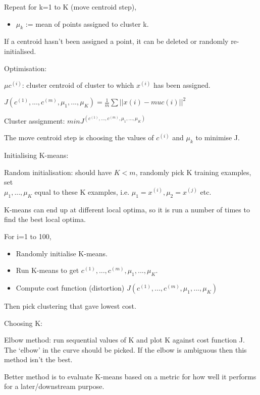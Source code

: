 \documentclass[12pt] {article}
\begin{document}
{    Repeat for k=1 to K (move centroid step),
    \begin{itemize}
    \vspace{-1em}
      \item $\mu_k$ := mean of points assigned to cluster k.
    \end{itemize}

    If a centroid hasn't been assigned a point, it can be deleted
    or randomly re-initialised. 

    Optimisation:

    $\mu c^{(i)}$: cluster centroid of cluster to which $x^{(i)}$ has been
    assigned.

    $J(c^{(1)},...,c^{(m)},\mu_1,...,\mu_K) = \frac{1}{m} \sum 
    ||x(i) - muc(i)||^2$

    Cluster assignment: $min J^(c^{(1)},...,c^{(m)},\mu_1,...,\mu_K)$

    The move centroid step is choosing the values of $c^{(i)}$ and $\mu_k$ to
    minimise J.
    
    Initialising K-means:
    
    Random initialisation: should have $K<m$, randomly pick K training
    examples, set\\$\mu_1,...,\mu_K$ equal to these K examples, i.e. $\mu_1 = 
    x^{(i)}, \mu_2 = x^{(j)}$ etc.
    
    K-means can end up at different local optima, so it is run a number of
    times to find the best local optima.

    For i=1 to 100,
    \begin{itemize}
    \vspace{-1em}
      \item Randomly initialise K-means.
      \item Run K-means to get $c^{(1)},...,c^{(m)},\mu_1,...,\mu_K.$
      \item Compute cost function (distortion)  $J(c^{(1)},...,c^{(m)},\mu_1,
            ...,\mu_K)$
    \end{itemize}

    Then pick clustering that gave lowest cost. 

    Choosing K:

    Elbow method: run sequential values of K and plot K against cost function
    J. The `elbow' in the curve should be picked. If the elbow is ambiguous 
    then this method isn't the best. 

    Better method is to evaluate K-means based on a metric for how well it 
    performs for a later/downstream purpose.


}
\end{document}
